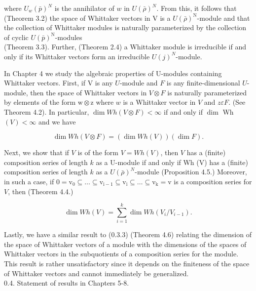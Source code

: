 \documentclass[10pt]{article}
\begin{document}
where $U_{w}(\bar{p})^{N}$ is the annihilator of $w$ in $U(\bar{\rho})^{N}$. From this, it follows that (Theorem 3.2) the space of Whittaker vectors in V is a $U(\bar{\rho})^{\mathrm{N}}$-module and that the collection of Whittaker modules is naturally parameterized by the collection of cyclic $U(\bar{p})^{\mathrm{N}}$-modules\\
(Theorem 3.3). Further, (Theorem 2.4) a Whittaker module is irreducible if and only if its Whittaker vectors form an irreducible $U(j)^{N}$-module.

In Chapter 4 we study the algebraic properties of U-modules containing Whittaker vectors. First, if V is any $U$-module and $F$ is any finite-dimensional $U$-module, then the space of Whittaker vectors in $V \otimes F$ is naturally parameterized by elements of the form $\mathrm{w} \otimes \mathrm{z}$ where $w$ is a Whittaker vector in $V$ and $z \varepsilon F$. (See Theorem 4.2). In particular, $\operatorname{dim} W h(V \otimes F)<\infty$ if and only if $\operatorname{dim}$ Wh $(V)<\infty$ and we have


\begin{equation*}
\operatorname{dim} W h(V \otimes F)=(\operatorname{dim} W h(V))(\operatorname{dim} F) . \tag{0.3.2}
\end{equation*}


Next, we show that if $V$ is of the form $V=W h(V)$, then $V$ has a (finite) composition series of length $k$ as a U-module if and only if Wh (V) has a (finite) composition series of length $k$ as a $U(\bar{\rho})^{N}$-module (Proposition 4.5.) Moreover, in such a case, if $0=\mathrm{v}_{0} \subseteq \ldots \subseteq \mathrm{v}_{\mathrm{i}-1} \subseteq \mathrm{v}_{\mathrm{i}} \subseteq \ldots \subseteq \mathrm{v}_{\mathrm{k}}=\mathrm{v}$ is a composition series for $V$, then (Theorem 4.4.)


\begin{equation*}
\operatorname{dim} W h(V)=\sum_{i=1}^{k} \operatorname{dim} W h\left(V_{i} / V_{i-1}\right) . \tag{0.3.3}
\end{equation*}


Lastly, we have a similar result to (0.3.3) (Theorem 4.6) relating the dimension of the space of Whittaker vectors of a module with the dimensions of the spaces of Whittaker vectors in the subquotients of a composition series for the module. This result is rather unsatisfactory since it depends on the finiteness of the space of Whittaker vectors and cannot immediately be generalized.\\
0.4. Statement of results in Chapters 5-8.
\end{document}
